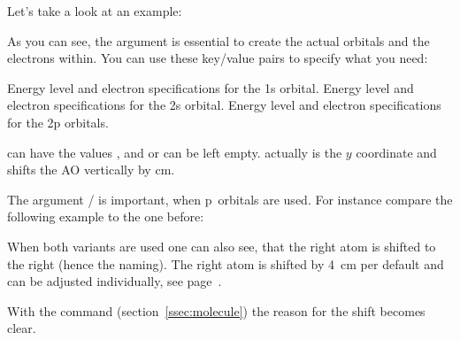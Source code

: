 \documentclass[load-preamble+]{cnltx-doc}
\begin{document}
Let's take a look at an example:
\begin{example}
  \begin{MOdiagram}
  \end{MOdiagram}
\end{example}

As you can see, the argument  is essential to create the actual
orbitals and the electrons within. You can use these key/value pairs to specify
what you need:
\begin{options}
     Energy level and electron specifications for the 1s orbital.
    Energy level and electron specifications for the 2s orbital.
    Energy level and electron specifications for the 2p orbitals.
\end{options}
 can have the values ,  and  or
can be left empty.  actually is the $y$ coordinate and shifts
the \ac{AO} vertically by  \si{\centi\metre}.

The argument / is important, when p~orbitals are used.
For instance compare the following example to the one before:
\begin{example}
  \begin{MOdiagram}
  \end{MOdiagram}
\end{example}

When both variants are used one can also see, that the right atom is shifted to
the right (hence the naming). The right atom is shifted by \SI{4}{\centi\metre}
per default and can be adjusted individually, see page~\pageref{option:distance}.
\begin{example}
  \begin{MOdiagram}
  \end{MOdiagram}
\end{example}
With the command  (section~\ref{ssec:molecule}) the reason for the
shift becomes clear.
\end{document}

